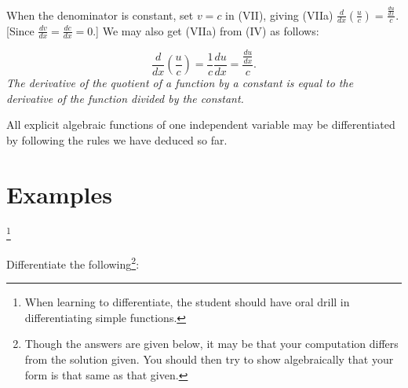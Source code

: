 When the denominator is constant, set $v = c$ in (VII), giving
(VIIa)
$\frac{d}{dx} \left ( \frac{u}{c} \right ) 	
= \frac{\frac{du}{dx}}{c}$.
[Since $\frac{dv}{dx} = \frac{dc}{dx} = 0$.]
We may also get (VIIa) from (IV) as follows:

\[
\frac{d}{dx} \left ( \frac{u}{c} \right ) 	
= \frac{1}{c} \frac{du}{dx} = \frac{\frac{du}{dx}}{c}.
\]
{\it The derivative of the quotient of a function by a constant 
is equal to the derivative of the function divided by the constant.}

All explicit algebraic functions of one independent variable 
may be differentiated by following the rules we have deduced so far.

\section{Examples}\footnote{When learning to differentiate, 
the student should have oral drill in differentiating simple functions.}

Differentiate the following\footnote{Though the answers are given 
below, it may be that your computation differs from the solution given.
You should then try to show algebraically that your form is that same 
as that given.}: %

